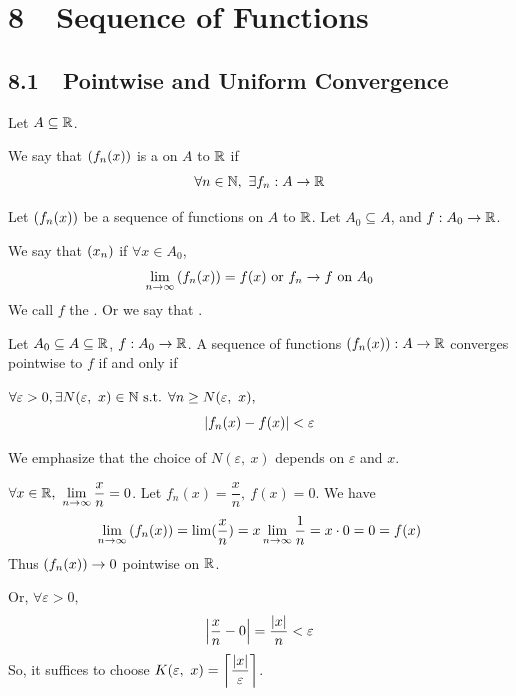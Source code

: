 \documentclass[a4paper,12pt]{article}
\begin{document}
\newpage

\section*{8\ \ Sequence of Functions}
\subsection*{8.1\ \ Pointwise and Uniform Convergence}
\begin{definition}
    Let \(A\subseteq\R\). 
    
    We say that \(\seqfun{x}\) is a  on \(A\) to \(\R\) if 
    \[\forall n\in\N,\ \exists f_n:A\rightarrow\R\]
\end{definition}

\begin{definition}
    Let \(\seqfun[n ]{x}\) be a sequence of functions on \(A\) to \(\R\). Let \(A_0\subseteq A\), and \(f:A_0\rightarrow\R\). 
    
    We say that \(\seq{x}{n}\)  if \(\forall x\in A_0\), 
    \[\limn{\seqfun{x}}=f(x)\text{ or }f_n\rightarrow f\text{ on }A_0\]
    We call \(f\) the . Or we say that .\\
\end{definition}

\begin{lemma}
    Let \(A_0\subseteq A\subseteq\R\), \(f:A_0\rightarrow\R\). 
    A sequence of functions \(\seqfun[n ]{x }:A\rightarrow\R\) converges pointwise to \(f\) if and only if 

    \(\forall \varepsilon>0, \exists N(\varepsilon,\ x)\in\N\st \forall n\ge N(\varepsilon,\ x),\)
    \[\abs{f_n(x)-f(x)}<\varepsilon\]
    \begin{remark}
        We emphasize that the choice of \(N(\varepsilon,\ x)\) depends on  \(\varepsilon\) and \(x\).\\
    \end{remark}
\end{lemma}

\begin{example}\(\ds \forall x\in\R,\ \limn{\frac{x }{n }}=0\). Let \(f_n(x)=\dfrac{x }{n },\ f(x)=0\). We have 
    \[\limn{\seqfun[n ]{x }}=\lim(\frac{x }{n })=x\limn{\frac{1 }{n }}=x\cdot 0=0=f(x)\]
    Thus \(\seqfun[n ]{x }\rightarrow 0\) pointwise on \(\R\). 

    Or, \(\forall \varepsilon>0, \)
    \[\abs{\frac{x }{n }-0}=\frac{\abs{x }}{n}<\varepsilon\]
    So, it suffices to choose \(K(\varepsilon,\ x)=\ds\left\lceil\frac{\abs{x}}{\varepsilon}\right\rceil\).
\end{example}
\end{document}
